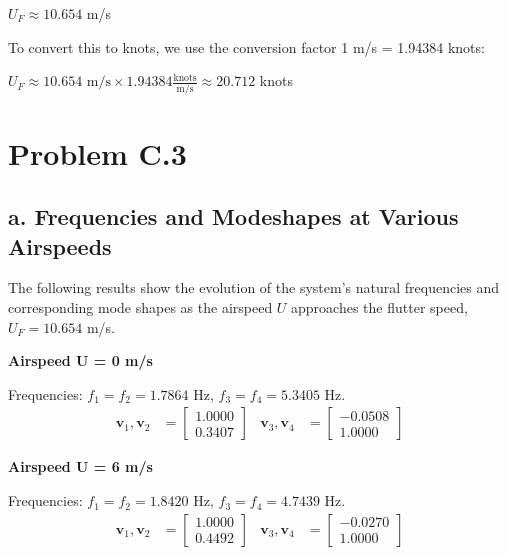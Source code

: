 \documentclass{article}
\begin{document}
$U_F \approx 10.654$ m/s

To convert this to knots, we use the conversion factor 1 m/s = 1.94384 knots:

$U_F \approx 10.654 \text{ m/s} \times 1.94384 \frac{\text{knots}}{\text{m/s}} \approx 20.712$ knots

\newpage
\section{Problem C.3}

\subsection{a. Frequencies and Modeshapes at Various Airspeeds}
The following results show the evolution of the system's natural frequencies and corresponding mode shapes as the airspeed $U$ approaches the flutter speed, $U_F = 10.654$ m/s.

\noindent\textbf{Airspeed U = 0 m/s}

\noindent Frequencies: $f_1 = f_2 = 1.7864$ Hz, $f_3 = f_4 = 5.3405$ Hz.
\begin{align*}
\mathbf{v}_1, \mathbf{v}_2 &= \begin{bmatrix} 1.0000 \\ 0.3407 \end{bmatrix} &
\mathbf{v}_3, \mathbf{v}_4 &= \begin{bmatrix} -0.0508 \\ 1.0000 \end{bmatrix}
\end{align*}

\noindent\textbf{Airspeed U = 6 m/s}

\noindent Frequencies: $f_1 = f_2 = 1.8420$ Hz, $f_3 = f_4 = 4.7439$ Hz.
\begin{align*}
\mathbf{v}_1, \mathbf{v}_2 &= \begin{bmatrix} 1.0000 \\ 0.4492 \end{bmatrix} &
\mathbf{v}_3, \mathbf{v}_4 &= \begin{bmatrix} -0.0270 \\ 1.0000 \end{bmatrix}
\end{align*}
\end{document}
